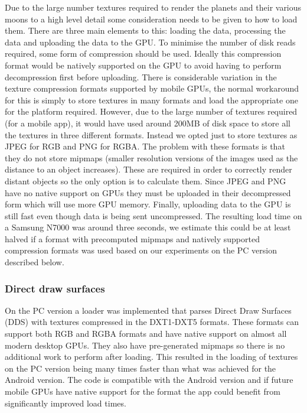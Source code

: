 Due to the large number textures required to render the planets and their various moons to a high level detail some consideration needs to be given to how to load them. There are three main elements to this: loading the data, processing the data and uploading the data to the GPU. To minimise the number of disk reads required, some form of compression should be used. Ideally this compression format would be natively supported on the GPU to avoid having to perform decompression first before uploading. There is considerable variation in the texture compression formats supported by mobile GPUs, the normal workaround for this is simply to store textures in many formats and load the appropriate one for the platform required. However, due to the large number of textures required (for a mobile app), it would have used around 200MB of disk space to store all the textures in three different formats. Instead we opted just to store textures as JPEG for RGB and PNG for RGBA. The problem with these formats is that they do not store mipmaps (smaller resolution versions of the images used as the distance to an object increases). These are required in order to correctly render distant objects so the only option is to calculate them. Since JPEG and PNG have no native support on GPUs they must be uploaded in their decompressed form which will use more GPU memory. Finally, uploading data to the GPU is still fast even though data is being sent uncompressed. The resulting load time on a Samsung N7000 was around three seconds, we estimate this could be at least halved if a format with precomputed mipmaps and natively supported compression formats was used based on our experiments on the PC version described below.

\subsubsection{Direct draw surfaces}

On the PC version a loader was implemented that parses Direct Draw Surfaces (DDS) with textures compressed in the DXT1-DXT5 formats. These formats can support both RGB and RGBA formats and have native support on almost all modern desktop GPUs. They also have pre-generated mipmaps so there is no additional work to perform after loading. This resulted in the loading of textures on the PC version being many times faster than what was achieved for the Android version. The code is compatible with the Android version and if future mobile GPUs have native support for the format the app could benefit from significantly improved load times.


